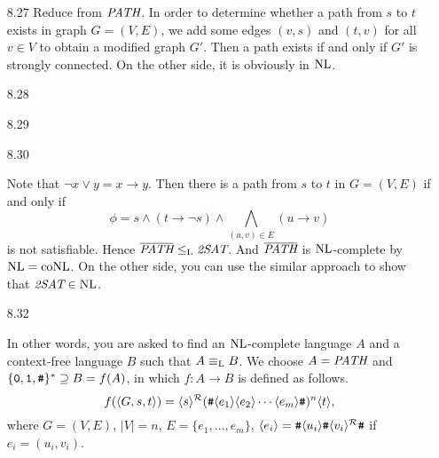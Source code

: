 \begin{itemize}
	\item[8.27]
	Reduce from $\textit{PATH}$. In order to determine whether a path from $s$ to $t$ exists in graph $G = (V, E)$, we add some edges $(v, s)$ and $(t, v)$ for all $v \in V$ to obtain a modified graph $G'$. Then a path exists if and only if $G'$ is strongly connected. On the other side, it is obviously in $\textrm{NL}$.
	
	\item[8.28]
	\Empty
	
	\item[8.29]
	\Empty
	
	\item[8.30]
	\Empty
		
	\item[\Star 8.31]
	Note that $\neg x \vee y = x \to y$. Then there is a path from $s$ to $t$ in $G = (V, E)$ if and only if
	$$
		\phi = s \wedge (t \to \neg s) \wedge \bigwedge_{(u, v) \in E} (u \to v)
	$$
	is not satisfiable. Hence $\overline{\textit{PATH}} \leq_{\textrm{L}} \textit{2SAT}$. And $\overline{\textit{PATH}}$ is $\textrm{NL}$-complete by $\textrm{NL} = \textrm{coNL}$. On the other side, you can use the similar approach to show that $\textit{2SAT} \in \textrm{NL}$.
	
	\item[8.32]
	\Empty
	
	\item[\Star 8.33] 
	In other words, you are asked to find an $\textrm{NL}$-complete language $A$ and a context-free language $B$ such that $A \equiv_{\textrm{L}} B$. We choose $A = \textit{PATH}$ and $\{\texttt{0}, \texttt{1}, \texttt{\#}\}^* \supseteq B = f(A)$, in which $f: A \to B$ is defined as follows.
	$$
		f(\langle {G, s, t} \rangle) = \langle {s} \rangle^{\mathcal{R}}(\texttt{\#} \langle {e_1} \rangle \langle {e_2} \rangle \cdots \langle {e_m} \rangle \texttt{\#} )^n\langle {t} \rangle,
	$$
	where $G = (V, E)$, $|V| = n$, $E = \{e_1, \dots, e_m\}$, $\langle {e_i} \rangle = \texttt{\#} \langle {u_i} \rangle\texttt{\#}\langle {v_i} \rangle^{\mathcal{R}}\texttt{\#}$ if $e_i = (u_i, v_i)$.
	
	\item[\Star 8.34] 
	\Omit
	
\end{itemize}